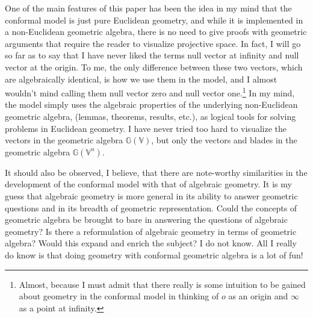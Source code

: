 \documentclass[12pt]{article}
\newcommand{\G}{\mathbb{G}}
\newcommand{\V}{\mathbb{V}}
\newcommand{\nvao}{o}
\newcommand{\nvai}{\infty}
\begin{document}
One of the main features of this paper has been the idea in my mind
that the conformal model is just pure Euclidean geometry, and while
it is implemented in a non-Euclidean geometric algebra, there is no
need to give proofs with geometric arguments that require the reader
to visualize projective space.  In fact, I will go so far as to say that
I have never liked the terms null vector at infinity and null vector at
the origin.  To me, the only difference between these two vectors, which are algebraically identical,
is how we use them in the model, and I almost wouldn't mind calling them null vector zero
and null vector one.\footnote{Almost, because I must admit that there really is some intuition to
be gained about geometry in the conformal model in thinking of $\nvao$ as an origin and $\nvai$ as a point at infinity.}
In my mind, the model simply uses the algebraic properties
of the underlying non-Euclidean geometric algebra, (lemmas, theorems, results, etc.), as logical tools for
solving problems in Euclidean geometry.  I have never tried too hard to visualize the vectors in the geometric
algebra $\G(\V)$, but only the vectors and blades in the geometric algebra $\G(\V^n)$.

It should also be observed, I believe, that there are note-worthy similarities in the
development of the conformal model with that of algebraic geometry.
It is my guess that algebraic geometry is more general in its
ability to answer geometric questions and in its breadth of geometric representation.
Could the concepts of geometric algebra be brought to bare in answering the questions of algebraic
geometry?  Is there a reformulation of algebraic geometry in terms of geometric algebra?
Would this expand and enrich the subject?  I do not know.  All I really do know is
that doing geometry with conformal geometric algebra is a lot of fun!

\pagebreak


\end{document}
